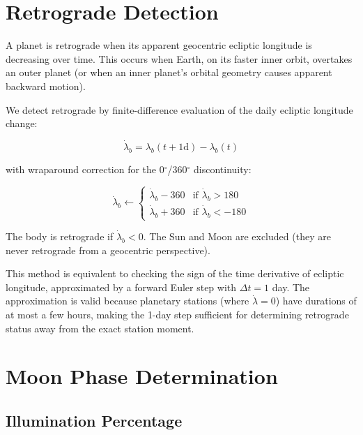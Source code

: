 \documentclass[11pt,letterpaper,twocolumn]{article}
\begin{document}
\section{Retrograde Detection}\label{sec:retrograde}

A planet is retrograde when its apparent geocentric ecliptic longitude is decreasing over time. This occurs when Earth, on its faster inner orbit, overtakes an outer planet (or when an inner planet's orbital geometry causes apparent backward motion).

We detect retrograde by finite-difference evaluation of the daily ecliptic longitude change:

\begin{equation}
\dot{\lambda}_b = \lambda_b(t + 1\text{d}) - \lambda_b(t)
\end{equation}

with wraparound correction for the 0$^\circ$/360$^\circ$ discontinuity:

\begin{equation}
\dot{\lambda}_b \leftarrow \begin{cases}
\dot{\lambda}_b - 360 & \text{if } \dot{\lambda}_b > 180 \\
\dot{\lambda}_b + 360 & \text{if } \dot{\lambda}_b < -180
\end{cases}
\end{equation}

The body is retrograde if $\dot{\lambda}_b < 0$. The Sun and Moon are excluded (they are never retrograde from a geocentric perspective).

This method is equivalent to checking the sign of the time derivative of ecliptic longitude, approximated by a forward Euler step with $\Delta t = 1$ day. The approximation is valid because planetary stations (where $\dot{\lambda} = 0$) have durations of at most a few hours, making the 1-day step sufficient for determining retrograde status away from the exact station moment.

\section{Moon Phase Determination}\label{sec:moon}

\subsection{Illumination Percentage}
\end{document}
